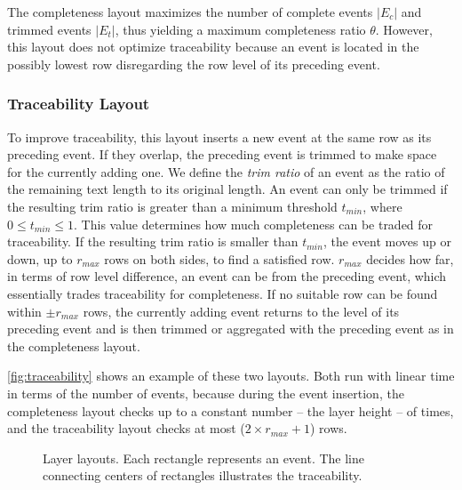The completeness layout maximizes the number of complete events $|E_c|$ and trimmed events $|E_t|$, thus yielding a maximum completeness ratio $\theta$. However, this layout does not optimize traceability because an event is located in the possibly lowest row disregarding the row level of its preceding event.

\subsubsection{Traceability Layout}
To improve traceability, this layout inserts a new event at the same row as its preceding event. If they overlap, the preceding event is trimmed to make space for the currently adding one. We define the \emph{trim ratio} of an event as the ratio of the remaining text length to its original length. An event can only be trimmed if the resulting trim ratio is greater than a minimum threshold $t_{min}$, where $0\leq t_{min} \leq 1$. This value determines how much completeness can be traded for traceability. If the resulting trim ratio is smaller than $t_{min}$, the event moves up or down, up to $r_{max}$ rows on both sides, to find a satisfied row. $r_{max}$ decides how far, in terms of row level difference, an event can be from the preceding event, which essentially trades traceability for completeness. If no suitable row can be found within $\pm r_{max}$ rows, the currently adding event returns to the level of its preceding event and is then trimmed or aggregated with the preceding event as in the completeness layout.

\autoref{fig:traceability} shows an example of these two layouts. Both  run with linear time in terms of the number of events, because during the event insertion, the completeness layout checks up to a constant number -- the layer height -- of times, and the traceability layout checks at most ($2 \times r_{max}+1$) rows.

\begin{figure}[!htb]
\centering
	\hfill
\caption{Layer layouts. Each rectangle represents an event. The line connecting centers of rectangles illustrates the  traceability.}
\label{fig:traceability}
\end{figure}

